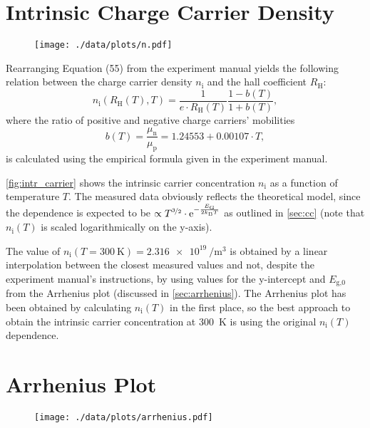 \section{Intrinsic Charge Carrier Density}
\begin{figure}
	\centering
	\texttt{[image: ./data/plots/n.pdf]}
	\label{fig:intr_carrier}
\end{figure}

Rearranging Equation (55) from the experiment manual yields the following relation between the charge carrier density $n_\text{i}$ and the hall coefficient $R_\text{H}$:
\begin{equation*}
	n_\text{i} \left(R_\text{H}\left( T \right), T \right) = \frac{1}{e \cdot R_\text{H}\left(T\right)} \frac{ 1 - b \left( T \right) }{ 1 + b \left( T \right) },
\end{equation*}
where the ratio of positive and negative charge carriers' mobilities
\begin{equation*}
	b \left( T \right) = \frac{\mu_\text{n}}{\mu_\text{p}} = \num{1.24553} + \num{0.00107} \cdot T,
\end{equation*}
is calculated using the empirical formula given in the experiment manual.

\autoref{fig:intr_carrier} shows the intrinsic carrier concentration $n_\text{i}$ as a function of temperature $T$.
The measured data obviously reflects the theoretical model, since the dependence is expected to be $\propto T^{\nicefrac{3}{2}}\cdot\mathrm{e}^{-\frac{E_\text{G}}{2k_\text{B}T}}$ as outlined in \autoref{sec:cc} (note that $n_\text{i}(T)$ is scaled logarithmically on the y-axis).

The value of $n_\text{i}\left(T = \SI{300}{\kelvin}\right) = \SI{2.316e19}{\per\cubic\meter}$ is obtained by a linear interpolation between the closest measured values and not, despite the experiment manual's instructions, by using values for the y-intercept and $E_\text{g,0}$ from the Arrhenius plot (discussed in \autoref{sec:arrhenius}).
The Arrhenius plot has been obtained by calculating $n_\text{i}(T)$ in the first place, so the best approach to obtain the intrinsic carrier concentration at \SI{300}{\kelvin} is using the original $n_\text{i}(T)$ dependence.

\section{Arrhenius Plot}\label{sec:arrhenius}
\begin{figure}
	\centering
	\texttt{[image: ./data/plots/arrhenius.pdf]}
	\label{fig:arrhenius}
\end{figure}

